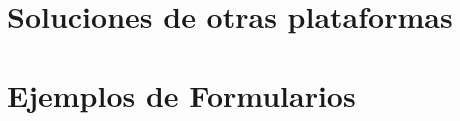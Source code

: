 \chapter{Soluciones de otras plataformas \ecommerceCOM}\label{ap:goodPractices:ecommerce}














\chapter{Ejemplos de Formularios}\label{ap:goodPractices:genericForms}

